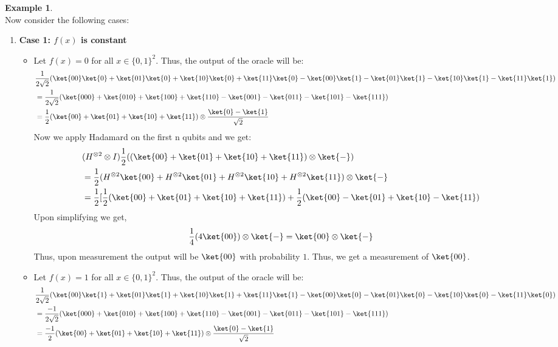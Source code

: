 \documentclass[12pt, oneside]{book}
\theoremstyle{definition}
\theoremstyle{definition}
\newtheorem{example}{Example}[section]
\theoremstyle{remark}
\begin{document}
\begin{example}
\[    \]
    Now consider the following cases:
    \begin{enumerate}
        \item \textbf{Case 1: $f(x)$ is constant}\\
        \begin{itemize}
            \item Let $f(x)=0$ for all $x \in \{0,1\}^2$. Thus, the output of the oracle will be:
            \begin{align*}
                &\frac{1}{2\sqrt{2}}(\ket{00}\ket{0}+\ket{01}\ket{0}+\ket{10}\ket{0}+\ket{11}\ket{0}-\ket{00}\ket{1}-\ket{01}\ket{1}-\ket{10}\ket{1}-\ket{11}\ket{1})\\
                &=\frac{1}{2\sqrt{2}}(\ket{000}+\ket{010}+\ket{100}+\ket{110}-\ket{001}-\ket{011}-\ket{101}-\ket{111})\\
                &=\frac{1}{2}(\ket{00}+\ket{01}+\ket{10}+\ket{11})\otimes \frac{\ket{0}-\ket{1}}{\sqrt{2}}
            \end{align*}
            Now we apply Hadamard on the first n qubits and we get:
            \begin{align*}
                &(H^{\otimes 2}\otimes I)\frac{1}{2}((\ket{00}+\ket{01}+\ket{10}+\ket{11})\otimes \ket{-})\\
                &
                =\frac{1}{2}(H^{\otimes 2}\ket{00}+H^{\otimes 2}\ket{01}+H^{\otimes 2}\ket{10}+H^{\otimes 2}\ket{11})\otimes \ket{-}\\
                &=\frac{1}{2}[\frac{1}{2}(\ket{00}+\ket{01}+\ket{10}+\ket{11})+\frac{1}{2}(\ket{00}-\ket{01}+\ket{10}-\ket{11})
            \end{align*}
            Upon simplifying we get,
            \[
                \frac{1}{4}(4\ket{00})\otimes \ket{-}=\ket{00}\otimes \ket{-}
            \]
            Thus, upon measurement the output will be $\ket{00}$ with probability $1$. Thus, we get a measurement of $\ket{00}$.
            \item Let $f(x)=1$ for all $x \in \{0,1\}^2$. Thus, the output of the oracle will be:
            \begin{align*}
                &\frac{1}{2\sqrt{2}}(\ket{00}\ket{1}+\ket{01}\ket{1}+\ket{10}\ket{1}+\ket{11}\ket{1}-\ket{00}\ket{0}-\ket{01}\ket{0}-\ket{10}\ket{0}-\ket{11}\ket{0})\\
            &=\frac{-1}{2\sqrt{2}}(\ket{000}+\ket{010}+\ket{100}+\ket{110}-\ket{001}-\ket{011}-\ket{101}-\ket{111})\\
            &=\frac{-1}{2}(\ket{00}+\ket{01}+\ket{10}+\ket{11})\otimes \frac{\ket{0}-\ket{1}}{\sqrt{2}}

\end{align*}
\end{itemize}
\end{enumerate}
\end{example}
\end{document}

